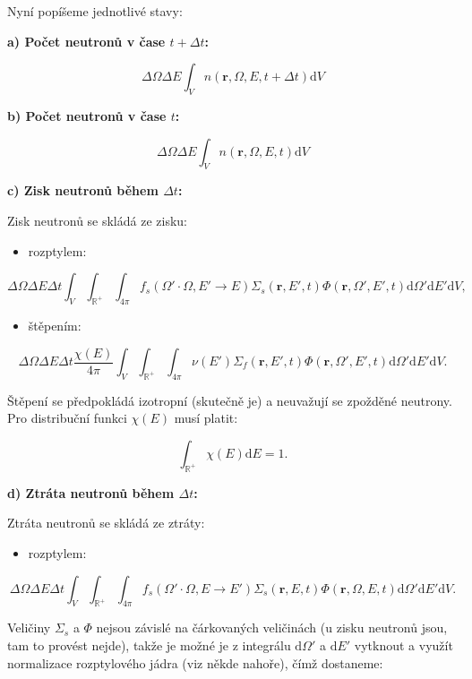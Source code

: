 Nyní popíšeme jednotlivé stavy:

\textbf{a) Počet neutronů v čase $t + \Delta t$:}

$$ \Delta \Omega \Delta E \int_V n(\textbf{r}, \Omega, E, t + \Delta t) \text{d}V $$

\textbf{b) Počet neutronů v čase $t$:}

$$ \Delta \Omega \Delta E \int_V n(\textbf{r}, \Omega, E, t) \text{d}V $$

\textbf{c) Zisk neutronů během $\Delta t$:}

Zisk neutronů se skládá ze zisku:

\begin{itemize}
  \item rozptylem:
\end{itemize}
$$ \Delta \Omega \Delta E \Delta t \int_V \int_\mathbb{R^+} \int_{4 \pi} f_s(\Omega' \cdot \Omega, E' \rightarrow E) \Sigma_s(\textbf{r}, E', t) \Phi(\textbf{r}, \Omega', E', t) \text{d}\Omega' \text{d}E' \text{d}V, $$

\begin{itemize}
  \item štěpením:
\end{itemize}
$$ \Delta \Omega \Delta E \Delta t \dfrac{\chi(E)}{4 \pi} \int_V \int_\mathbb{R^+} \int_{4 \pi} \nu(E') \Sigma_f(\textbf{r}, E', t) \Phi(\textbf{r}, \Omega', E', t) \text{d}\Omega' \text{d}E' \text{d}V. $$


Štěpení se předpokládá izotropní (skutečně je) a neuvažují se zpožděné neutrony. Pro distribuční funkci $\chi(E)$ musí platit:

$$ \int_\mathbb{R^+} \chi(E) \text{d} E = 1. $$

\textbf{d) Ztráta neutronů během $\Delta t$:}

Ztráta neutronů se skládá ze ztráty:

\begin{itemize}
  \item rozptylem:
\end{itemize}
$$ \Delta \Omega \Delta E \Delta t \int_V \int_\mathbb{R^+} \int_{4 \pi} f_s(\Omega' \cdot \Omega, E \rightarrow E') \Sigma_s(\textbf{r}, E, t) \Phi(\textbf{r}, \Omega, E, t) \text{d}\Omega' \text{d}E' \text{d}V. $$

Veličiny $\Sigma_s$ a $\Phi$ nejsou závislé na čárkovaných veličinách (u zisku neutronů jsou, tam to provést nejde), takže je možné je z integrálu $\text{d}\Omega'$ a $\text{d}E'$ vytknout a využít normalizace rozptylového jádra (viz někde nahoře), čímž dostaneme:

